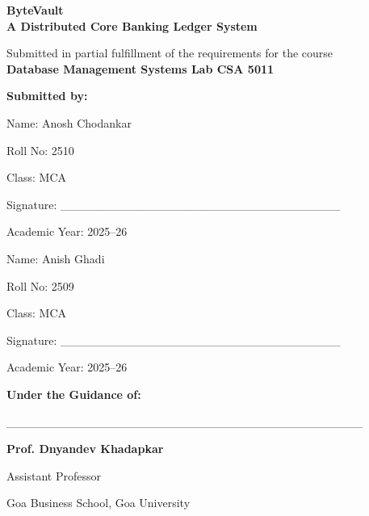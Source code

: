 \documentclass[12pt,a4paper]{report}
\begin{document}
\begin{titlepage}
    \centering
    \vspace*{1cm}
    
    {\Huge\bfseries ByteVault \\ \Large A Distributed Core Banking Ledger System\par}
    \vspace{1.5cm}
    
    {\Large Submitted in partial fulfillment of the requirements for the course \\ \textbf{Database Management Systems Lab CSA 5011}\par}
    \vspace{2cm}
    
    \textbf{Submitted by:}\par
    \vspace{0.5cm}
    \begin{flushleft}
    Name: Anosh Chodankar \par
    Roll No: 2510 \par
    Class: MCA \par
    Signature: \_\_\_\_\_\_\_\_\_\_\_\_\_\_\_\_\_\_\_\_\_\_\_\_\_\_\_\_\_\_\_\_\_ \par
    Academic Year: 2025--26 \par
    \vspace{1cm}
    Name: Anish Ghadi \par
    Roll No: 2509 \par
    Class: MCA  \par
    Signature: \_\_\_\_\_\_\_\_\_\_\_\_\_\_\_\_\_\_\_\_\_\_\_\_\_\_\_\_\_\_\_\_\_ \par
    Academic Year: 2025--26 \par
    \end{flushleft}
    
    \vfill
    
    \textbf{Under the Guidance of:}\par
    \vspace{0.5cm}
    \_\_\_\_\_\_\_\_\_\_\_\_\_\_\_\_\_\_\_\_\_\_\_\_\_\_\_\_\_\_\_\_\_\_\_\_\_\_\_\_\_\_ \par
    \textbf{Prof. Dnyandev Khadapkar}\par
    Assistant Professor \par
    Goa Business School, Goa University\par
\end{titlepage}

\tableofcontents
\newpage










\end{document}
